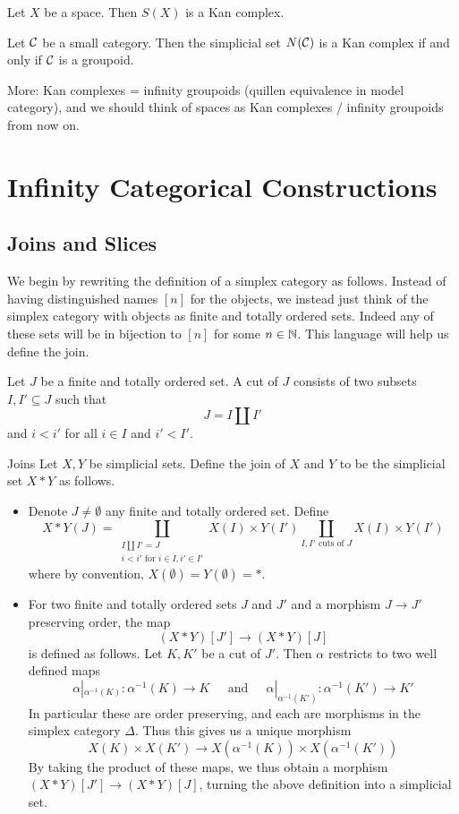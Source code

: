 \documentclass[a4paper]{article}
\begin{document}
\begin{prp}{}{} Let $X$ be a space. Then $S(X)$ is a Kan complex. 
\end{prp}

\begin{thm}{}{} Let $\mathcal{C}$ be a small category. Then the simplicial set $N(\mathcal{C})$ is a Kan complex if and only if $\mathcal{C}$ is a groupoid. 
\end{thm}

More: Kan complexes = infinity groupoids (quillen equivalence in model category), and we should think of spaces as Kan complexes / infinity groupoids from now on. 

\pagebreak
\section{Infinity Categorical Constructions}
\subsection{Joins and Slices}
We begin by rewriting the definition of a simplex category as follows. Instead of having distinguished names $[n]$ for the objects, we instead just think of the simplex category with objects as finite and totally ordered sets. Indeed any of these sets will be in bijection to $[n]$ for some $n\in\mathbb{N}$. This language will help us define the join. 

\begin{defn}{}{} Let $J$ be a finite and totally ordered set. A cut of $J$ consists of two subsets $I,I'\subseteq J$ such that $$J=I\amalg I'$$ and $i<i'$ for all $i\in I$ and $i'<I'$. 
\end{defn}

\begin{defn}{Joins}{} Let $X,Y$ be simplicial sets. Define the join of $X$ and $Y$ to be the simplicial set $X\ast Y$ as follows. 
\begin{itemize}
\item Denote $J\neq\emptyset$ any finite and totally ordered set. Define $$X\ast Y(J)=\coprod_{\substack{I\amalg I'=J\\i<i'\text{ for }i\in I,i'\in I'}}X(I)\times Y(I')\coprod_{I,I'\text{ cuts of }J}X(I)\times Y(I')$$ where by convention, $X(\emptyset)=Y(\emptyset)=\ast$. 
\item For two finite and totally ordered sets $J$ and $J'$ and a morphism $J\to J'$ preserving order, the map $$(X\ast Y)[J']\to(X\ast Y)[J]$$ is defined as follows. Let $K,K'$ be a cut of $J'$. Then $\alpha$ restricts to two well defined maps $$\alpha|_{\alpha^{-1}(K)}:\alpha^{-1}(K)\to K\;\;\;\;\text{ and }\;\;\;\;\alpha|_{\alpha^{-1}(K')}:\alpha^{-1}(K')\to K'$$ In particular these are order preserving, and each are morphisms in the simplex category $\Delta$. Thus this gives us a unique morphism $$X(K)\times X(K')\to X(\alpha^{-1}(K))\times X(\alpha^{-1}(K'))$$ By taking the product of these maps, we thus obtain a morphism $(X\ast Y)[J']\to(X\ast Y)[J]$, turning the above definition into a simplicial set. 
\end{itemize}
\end{defn}
\end{document}
